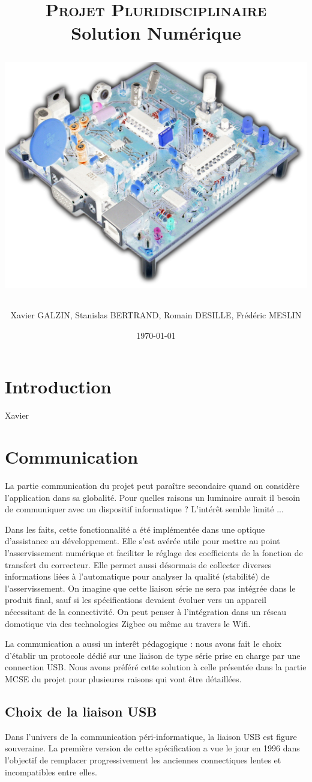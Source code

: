 \documentclass[11pt, french]{article} %
\title{\textsc{Projet Pluridisciplinaire} \\ Solution Numérique \\
\begin{minipage}[c][20cm][c]{15cm}
\includegraphics[width=15cm]{../Photos/CarteFrontInv.png}
\end{minipage}}
\author{Xavier GALZIN, Stanislas BERTRAND, Romain DESILLE, Frédéric MESLIN}
\date{\today}
\begin{document}
\maketitle

\pagebreak
\tableofcontents

\pagebreak
\section*{Introduction}
Xavier

\section{Communication}
	La partie communication du projet peut paraître secondaire quand on considère l'application dans sa globalité. Pour quelles raisons un luminaire aurait il besoin de communiquer avec un dispositif informatique ? L'intérêt semble limité ...

\medskip
Dans les faits, cette fonctionnalité a été implémentée dans une optique d'assistance au développement. Elle s'est avérée utile pour mettre au point l'asservissement numérique et faciliter le réglage des coefficients de la fonction de transfert du correcteur. Elle permet aussi désormais de collecter diverses informations liées à l'automatique pour analyser la qualité (stabilité) de l'asservissement. On imagine que cette liaison série ne sera pas intégrée dans le produit final, sauf si les spécifications devaient évoluer vers un appareil nécessitant de la connectivité. On peut penser à l'intégration dans un réseau domotique via des technologies Zigbee ou même au travers le Wifi.

La communication a aussi un interêt pédagogique : nous avons fait le choix d'établir un protocole dédié sur une liaison de type série prise en charge par une connection USB. Nous avons préféré cette solution à celle présentée dans la partie MCSE du projet pour plusieures raisons qui vont être détaillées.

\subsection{Choix de la liaison USB}
	
Dans l'univers de la communication péri-informatique, la liaison USB est figure souveraine. La première version de cette spécification a vue le jour en 1996 dans l'objectif de remplacer progressivement les anciennes connectiques lentes et incompatibles entre elles.
\end{document}
